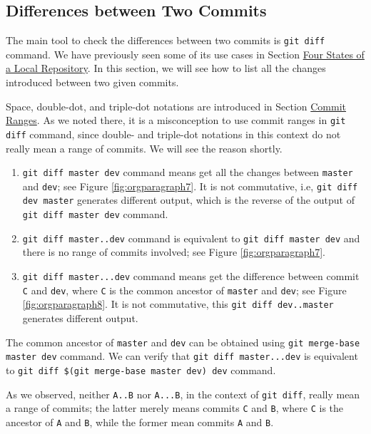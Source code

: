 \documentclass[11pt]{article}
\begin{document}
\subsection{\label{orgtarget2} Differences between Two Commits}
\label{sec:orgheadline18}
The main tool to check the differences between two commits is \texttt{git diff} command. We have previously seen some of its use cases in Section \hyperref[orgtarget5]{Four States of a Local Repository}. In this section, we will see how to list all the changes introduced between two given commits.

Space, double-dot, and triple-dot notations are introduced in Section \hyperref[orgtarget3]{Commit Ranges}. As we noted there, it is a misconception to use commit ranges in \texttt{git diff} command, since double- and triple-dot notations in this context do not really mean a range of commits. We will see the reason shortly.

\begin{enumerate}
\item \texttt{git diff master dev} command means get all the changes between \texttt{master} and \texttt{dev}; see Figure \ref{fig:orgparagraph7}. It is not commutative, i.e, \texttt{git diff dev master} generates different output, which is the reverse of the output of \texttt{git diff master dev} command.
\item \texttt{git diff master..dev} command is equivalent to \texttt{git diff master dev} and there is no range of commits involved; see Figure \ref{fig:orgparagraph7}.
\item \texttt{git diff master...dev} command means get the difference between commit \texttt{C} and \texttt{dev}, where \texttt{C} is the common ancestor of \texttt{master} and \texttt{dev}; see Figure \ref{fig:orgparagraph8}. It is not commutative, this \texttt{git diff dev..master} generates different output.
\end{enumerate}

The common ancestor of \texttt{master} and \texttt{dev} can be obtained using \texttt{git merge-base master dev} command. We can verify that \texttt{git diff master...dev} is equivalent to \texttt{git diff \$(git merge-base master dev) dev} command.

As we observed, neither \texttt{A..B} nor \texttt{A...B}, in the context of \texttt{git diff}, really mean a range of commits; the latter merely means commits \texttt{C} and \texttt{B}, where \texttt{C} is the  ancestor of \texttt{A} and \texttt{B}, while the former mean commits \texttt{A} and \texttt{B}.
\end{document}
